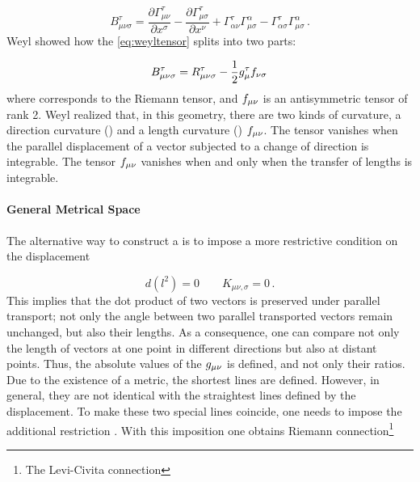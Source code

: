 \documentclass[submitted]{article}
\newcommand{\faradaymn}{\ensuremath{f\mn}}
\newcommand{\faraday}{\ensuremath{f}}
\begin{document}
\begin{equation}\label{eq:weyltensor} 
B_{\mu \nu \sigma}^{\tau} =\frac{\partial \Gamma_{\mu \nu}^{\tau}}{\partial x^{\sigma}}-\frac{\partial \Gamma_{\mu \sigma}^{\tau}}{\partial x^{\nu}}+\Gamma_{\alpha \nu}^{\tau} \Gamma_{\mu \sigma}^{\alpha}-\Gamma_{\alpha \sigma}^{\tau} \Gamma_{\mu \sigma}^{\alpha}\,.
\end{equation}
%
Weyl showed how the \cref{eq:weyltensor} splits into two parts:

\begin{equation*}
B_{\mu \nu \sigma}^{\tau} = \rite - \frac{1}{2} g^\tau_\mu \faraday_{\nu\sigma}\,
\end{equation*}
%
where \rite corresponds to the Riemann tensor, and $\faradaymn$ is an antisymmetric tensor of rank 2. Weyl realized that, in this geometry, there are two kinds of curvature, a direction curvature () \rite and a length curvature () $\faradaymn$. The tensor \rite vanishes when the parallel displacement of a vector subjected to a change of direction is integrable. The tensor $\faradaymn$ vanishes when and only when the transfer of lengths is integrable.


\paragraph{General Metrical Space} The alternative way to construct a  is to impose a more restrictive condition on the displacement

\begin{equation*}
d\left({l}^{2}\right)=0 \quad \quad K_{\mu \nu, \sigma}= 0\,.
\end{equation*}
% 
This implies that the dot product of two vectors is preserved under parallel transport; not only the angle between two parallel transported vectors remain unchanged, but also their lengths. As a consequence, one can compare not only the length of vectors at one point in different directions but also at distant points. Thus, the absolute values of the $g_{\mu\nu}$ is defined, and not only their ratios. Due to the existence of a metric, the shortest lines are defined. However, in general, they are not identical with the straightest lines defined by the displacement. To make these two special lines coincide, one needs to impose the additional restriction \sym. With this imposition one obtains Riemann connection\footnote{The Levi-Civita connection}
\end{document}
